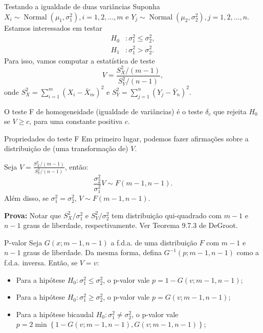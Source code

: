  \begin{frame}{Testando a igualdade de duas variâncias}
  Suponha $X_i \sim\operatorname{Normal}(\mu_1, \sigma_1^2), i = 1, 2, \ldots, m$ e $Y_j \sim\operatorname{Normal}(\mu_2, \sigma_2^2), j = 1, 2, \ldots, n$.
  Estamos interessados em testar
  \begin{align*}
   H_0 &: \sigma_1^2 \leq \sigma_2^2 , \\
   H_1&:  \sigma_1^2 > \sigma_2^2. 
  \end{align*}
 Para isso, vamos computar a estatística de teste 
 \begin{equation*}
  V = \frac{S_X^2/(m-1)}{S_Y^2/(n-1)},
 \end{equation*}
 onde $S_X^2 = \sum_{i=1}^m (X_i-\bar{X}_m)^2$ e $S_Y^2 = \sum_{j=1}^n (Y_j-\bar{Y}_n)^2$.
 
 \begin{defn}[O teste F]
 \label{def:F_test}
  O teste F de homogeneidade (igualdade de variâncias)  é o teste $\delta_c$ que rejeita $H_0$ se $V \geq c$, para uma constante positiva $c$.
 \end{defn}

 \end{frame}

 \begin{frame}{Propriedades do teste F}
  Em primeiro lugar, podemos fazer afirmações sobre a distribuição de (uma transformação de) $V$.
  \begin{theo}[A distribuição de $V$]
  \label{thm:V_distribution}
   Seja $V = \frac{S_X^2/(m-1)}{S_Y^2/(n-1)}$, então:
   \begin{equation*}
    \frac{\sigma_2^2}{\sigma_1^2} V \sim F(m-1, n-1).
   \end{equation*}
   Além disso, se $\sigma_1^2 = \sigma_2^2$, $V \sim F(m-1, n-1)$. 
  \end{theo}
\textbf{Prova:} Notar que $S_X^2/\sigma_1^2$ e $S_Y^2/\sigma_2^2$  tem distribuição qui-quadrado com $m-1$ e $n-1$ graus de liberdade, respectivamente.
Ver Teorema 9.7.3 de DeGroot.
 \end{frame}
 
 \begin{frame}{P-valor}
  Seja $G(x; m-1, n-1)$ a f.d.a. de uma distribuição $F$ com $m-1$ e $n-1$ graus de liberdade.
  Da mesma forma, defina $G^{-1}(p; m-1, n-1)$ como a f.d.a. inversa.
  Então, se $V = v$:
  \begin{itemize}
   \item Para a hipótese $H_0: \sigma_1^2 \leq \sigma_2^2$, o p-valor vale $p = 1-G(v; m-1, n-1)$;
   \item Para a hipótese $H_0: \sigma_1^2 \geq \sigma_2^2$, o p-valor vale $p = G(v; m-1, n-1)$;
   \item Para a hipótese bicaudal $H_0: \sigma_1^2 \neq \sigma_2^2$, o p-valor vale $p = 2\min\left\{1-G(v; m-1, n-1), G(v; m-1, n-1)\right\}$;
  \end{itemize}
 \end{frame}
 
